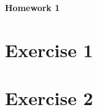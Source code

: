 \documentclass[a4paper,12pt]{article} %
\begin{document}
\begin{center} %
    {\Large \bf Homework 1}
\end{center}

\vspace{0.4cm}


\onehalfspacing
\section{Exercise 1}


\section{Exercise 2}
\end{document}
